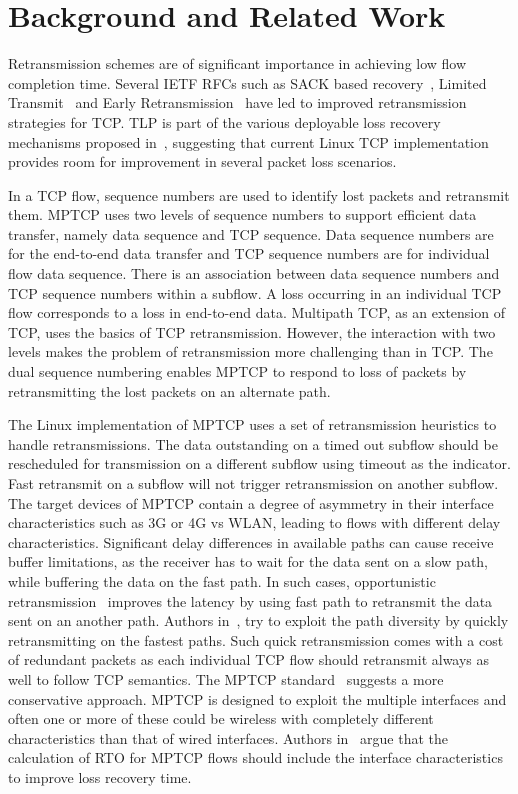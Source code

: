 \documentclass[10pt,conference]{IEEEtran}
\begin{document}
\section{Background and Related Work}\label{relwork}

Retransmission schemes are of significant importance in achieving low flow completion time. Several IETF RFCs such as SACK based recovery~\cite{rfc6675}, Limited Transmit~\cite{rfc3042} and Early Retransmission~\cite{rfc5827} have led to improved retransmission strategies for TCP. TLP is part of the various deployable loss recovery mechanisms proposed in~\cite{Flach:2013}, suggesting that current Linux TCP implementation provides room for improvement in several packet loss scenarios. 

In a TCP flow, sequence numbers are used to identify lost packets and retransmit them. MPTCP uses two levels of sequence numbers to support efficient data transfer, namely data sequence and TCP sequence. Data sequence numbers are for the end-to-end data transfer and TCP sequence numbers are for individual flow data sequence. There is an association between data sequence numbers and TCP sequence numbers within a subflow.  A loss occurring in an individual TCP flow corresponds to a loss in end-to-end data. Multipath TCP, as an extension of TCP, uses the basics of TCP retransmission. However, the interaction with two levels makes the problem of retransmission more challenging than in TCP. The dual sequence numbering enables MPTCP to respond to loss of packets by retransmitting the lost packets on an alternate path.  

The Linux implementation of MPTCP uses a set of retransmission heuristics to handle retransmissions. The data outstanding on a timed out subflow should be rescheduled for transmission on a different subflow using timeout as the indicator. Fast retransmit on a subflow will not trigger retransmission on another subflow. The target devices of MPTCP contain a degree of asymmetry in their interface characteristics such as 3G or 4G vs WLAN, leading to flows with different delay characteristics. Significant delay differences in available paths can cause receive buffer limitations, as the receiver has to wait for the data sent on a slow path, while buffering the data on the fast path. In such cases, opportunistic retransmission~\cite{Costin} improves the latency by using fast path to retransmit the data sent on an another path. Authors in~\cite{fuso}, try to exploit the path diversity by quickly retransmitting on the fastest paths. Such quick retransmission comes with a cost of redundant packets as each individual TCP flow should retransmit always as well to follow TCP semantics. The MPTCP standard~\cite{rfc6824} suggests a more conservative approach. MPTCP is designed to exploit the multiple interfaces and often one or more of these could be wireless with completely different characteristics than that of wired interfaces. Authors in~\cite{Shin} argue that the calculation of RTO for MPTCP flows should include the interface characteristics to improve loss recovery time. 
\end{document}
